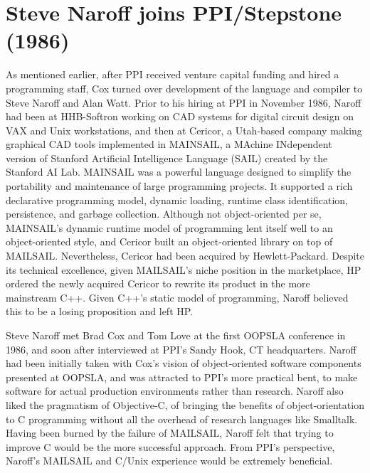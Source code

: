 \documentclass[acmsmall,screen]{acmart}
\begin{document}
\section{Steve Naroff joins PPI/Stepstone (1986)}
\label{sec-SteveNaroffJoinsStepstone1986}
As mentioned earlier, after PPI received venture capital funding and hired a programming staff, Cox turned over development of the language and compiler to Steve Naroff and Alan Watt. Prior to his hiring at PPI in November 1986, Naroff had been at HHB-Softron working on CAD systems for digital circuit design on VAX and Unix workstations, and then at Cericor, a Utah-based company making graphical CAD tools implemented in MAINSAIL, a MAchine INdependent version of Stanford Artificial Intelligence Language (SAIL) created by the Stanford AI Lab. MAINSAIL was a powerful language designed to simplify the portability and maintenance of large programming projects. It supported a rich declarative programming model, dynamic loading, runtime class identification, persistence, and garbage collection. Although not object-oriented per se, MAINSAIL's dynamic runtime model of programming lent itself well to an object-oriented style, and Cericor built an object-oriented library on top of MAILSAIL. Nevertheless, Cericor had been acquired by Hewlett-Packard. Despite its technical excellence, given MAILSAIL's niche position in the marketplace, HP ordered the newly acquired Cericor to rewrite its product in the more mainstream C++. Given C++'s static model of programming, Naroff believed this to be a losing proposition and left HP.

Steve Naroff met Brad Cox and Tom Love at the first OOPSLA conference in 1986, and soon after interviewed at PPI's Sandy Hook, CT headquarters. Naroff had been initially taken with Cox's vision of object-oriented software components presented at OOPSLA, and was attracted to PPI's more practical bent, to make software for actual production environments rather than research. Naroff also liked the pragmatism of Objective-C, of bringing the benefits of object-orientation to C programming without all the overhead of research languages like Smalltalk. Having been burned by the failure of MAILSAIL, Naroff felt that trying to improve C would be the more successful approach. From PPI's perspective, Naroff's MAILSAIL and C/Unix experience would be extremely beneficial.
\end{document}
